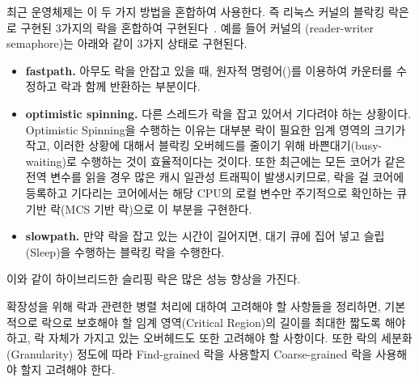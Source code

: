 최근 운영체제는 이 두 가지 방법을 혼합하여 사용한다. 
즉 리눅스 커널의 블락킹 락은 로 구현된 3가지의
락을 혼합하여 구현된다~\cite{Bueso2014STP}.
예를 들어 커널의 (reader-writer semaphore)는 아래와 같이 3가지 상태로 구현된다.
\begin{itemize}
\item \textbf{fastpath.} 아무도 락을 안잡고 있을 때, 원자적 명령어()를 이용하여
카운터를 수정하고 락과 함께 반환하는 부분이다.
\item \textbf{optimistic spinning.} 다른 스레드가 락을 잡고 있어서 기다려야 하는 상황이다.
Optimistic Spinning을 수행하는 이유는 대부분 락이 필요한 임계 영역의 크기가 작고, 
이러한 상황에 대해서 블락킹 오버헤드를 줄이기 위해 바쁜대기(busy-waiting)로 수행하는 것이 
효율적이다는 것이다. 
또한 최근에는 모든 코어가 같은 전역 변수를 읽을 경우 많은 캐시 일관성 트래픽이 발생시키므로, 
락을 걸 코어에 등록하고 기다리는 코어에서는 해당 CPU의 로컬 변수만 주기적으로 확인하는 
큐 기반 락(MCS 기반 락)으로 이 부분을 구현한다. 
\item \textbf{slowpath.} 만약 락을 잡고 있는 시간이 길어지면, 대기 큐에 집어 넣고 슬립(Sleep)을 수행하는 블락킹 
락을 수행한다. 
\end{itemize}
이와 같이 하이브리드한 슬리핑 락은 많은 성능 향상을 가진다. 







확장성을 위해 락과 관련한 병렬 처리에 대하여 고려해야 할 사항들을 정리하면,
기본적으로 락으로 보호해야 할 임계 영역(Critical Region)의 길이를 최대한 짧도록 해야 하고, 
락 자체가 가지고 있는 오버헤드도 또한 고려해야 할 사항이다. 
또한 락의 세분화(Granularity) 정도에 따라 Find-grained 락을 사용할지 Coarse-grained 락을 사용해야 할지 
고려해야 한다.

